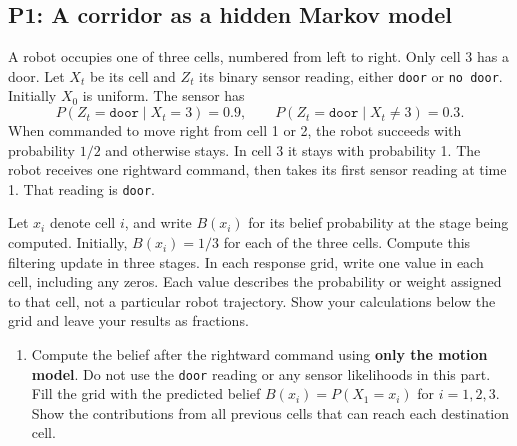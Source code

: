 \documentclass[11pt]{article}
\newcommand{\cellbelief}{B}            %
\newenvironment{studentanswer}[1]
  {\par\medskip\noindent
   \begin{tcolorbox}[height from=#1 to 100cm, colback=white, colframe=gray!60,
     boxrule=0.6pt, arc=0pt, outer arc=0pt, left=7pt, right=7pt,
     top=7pt, bottom=7pt, title={Answer / work}, fonttitle=\small,
     coltitle=black, colbacktitle=gray!8, titlerule=0pt]
   \ignorespaces}
  {\end{tcolorbox}\par}
\begin{document}
\subsection*{P1: A corridor as a hidden Markov model}
A robot occupies one of three cells, numbered from left to right. Only
cell 3 has a door. Let $X_t$ be its cell and $Z_t$ its binary sensor
reading, either \texttt{door} or \texttt{no door}. Initially $X_0$ is
uniform. The sensor has
\[
P(Z_t=\texttt{door}\mid X_t=3)=0.9,\qquad
P(Z_t=\texttt{door}\mid X_t\ne3)=0.3.
\]
When commanded to move right from cell 1 or 2, the robot succeeds with
probability $1/2$ and otherwise stays. In cell 3 it stays with probability 1.
The robot receives one rightward command, then takes its first sensor
reading at time 1. That reading is \texttt{door}.

Let $x_i$ denote cell $i$, and write $\cellbelief(x_i)$ for its belief
probability at the stage being computed. Initially,
$\cellbelief(x_i)=1/3$ for each of the three cells.
Compute this filtering update in three stages. In each response grid,
write one value in each cell, including any zeros. Each value describes
the probability or weight assigned to that cell, not a particular
robot trajectory. Show your calculations below the grid and leave
your results as fractions.
\begin{center}
\end{center}
\begin{enumerate}[label=(\alph*)]
\item \begin{minipage}[t]{\linewidth} Compute the belief after the rightward command using
\textbf{only the motion model}. Do not use the \texttt{door} reading or
any sensor likelihoods in this part. Fill the grid with the predicted
belief $\cellbelief(x_i)=P(X_1=x_i)$ for $i=1,2,3$. Show the contributions
from all previous cells that can reach each destination cell.

\begin{studentanswer}{5cm}
\begin{center}
\end{center}
\end{studentanswer}

\end{minipage}
\end{enumerate}
\end{document}

